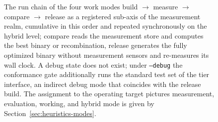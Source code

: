 \begin{nurkurz}
\begin{figure}[htbp]
\caption{The run chain of the four work modes build $\to$ measure $\to$ compare $\to$ release as a registered sub-axis of the measurement realm, cumulative in this order and repeated synchronously on the hybrid level; compare reads the measurement store and computes the best binary or recombination, release generates the fully optimized binary without measurement sensors and re-measures its wall clock. A debug state does not exist; under \texttt{--debug} the conformance gate additionally runs the standard test set of the tier interface, an indirect debug mode that coincides with the release build. The assignment to the operating target pictures measurement, evaluation, working, and hybrid mode is given by Section~\ref{sec:heuristics-modes}.}\label{fig:modi-kette}
\end{figure}
\end{nurkurz}

